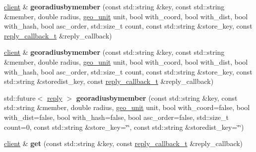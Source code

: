 \begin{DoxyCompactItemize}
\item 
\mbox{\label{classcpp__redis_1_1client_aa0ab44c2f13449d9b3d2df0023871d4e}} 
\hyperlink{classcpp__redis_1_1client}{client} \& {\bfseries georadiusbymember} (const std\+::string \&key, const std\+::string \&member, double radius, \hyperlink{classcpp__redis_1_1client_aa5998536fd32ff4387c89be514997620}{geo\+\_\+unit} unit, bool with\+\_\+coord, bool with\+\_\+dist, bool with\+\_\+hash, bool asc\+\_\+order, std\+::size\+\_\+t count, const std\+::string \&store\+\_\+key, const \hyperlink{classcpp__redis_1_1client_a061a1140d36d2eaeda82b09a0bb3f9f2}{reply\+\_\+callback\+\_\+t} \&reply\+\_\+callback)
\item 
\mbox{\label{classcpp__redis_1_1client_a139e586e190702f5e59190292a03d6e9}} 
\hyperlink{classcpp__redis_1_1client}{client} \& {\bfseries georadiusbymember} (const std\+::string \&key, const std\+::string \&member, double radius, \hyperlink{classcpp__redis_1_1client_aa5998536fd32ff4387c89be514997620}{geo\+\_\+unit} unit, bool with\+\_\+coord, bool with\+\_\+dist, bool with\+\_\+hash, bool asc\+\_\+order, std\+::size\+\_\+t count, const std\+::string \&store\+\_\+key, const std\+::string \&storedist\+\_\+key, const \hyperlink{classcpp__redis_1_1client_a061a1140d36d2eaeda82b09a0bb3f9f2}{reply\+\_\+callback\+\_\+t} \&reply\+\_\+callback)
\item 
\mbox{\label{classcpp__redis_1_1client_af4bc0403124cbf5e7f6341bbb160d08b}} 
std\+::future$<$ \hyperlink{classcpp__redis_1_1reply}{reply} $>$ {\bfseries georadiusbymember} (const std\+::string \&key, const std\+::string \&member, double radius, \hyperlink{classcpp__redis_1_1client_aa5998536fd32ff4387c89be514997620}{geo\+\_\+unit} unit, bool with\+\_\+coord=false, bool with\+\_\+dist=false, bool with\+\_\+hash=false, bool asc\+\_\+order=false, std\+::size\+\_\+t count=0, const std\+::string \&store\+\_\+key=\char`\"{}\char`\"{}, const std\+::string \&storedist\+\_\+key=\char`\"{}\char`\"{})
\item 
\mbox{\label{classcpp__redis_1_1client_a1521d8c4c751d970c446aae7ccf8cc35}} 
\hyperlink{classcpp__redis_1_1client}{client} \& {\bfseries get} (const std\+::string \&key, const \hyperlink{classcpp__redis_1_1client_a061a1140d36d2eaeda82b09a0bb3f9f2}{reply\+\_\+callback\+\_\+t} \&reply\+\_\+callback)

\end{DoxyCompactItemize}
